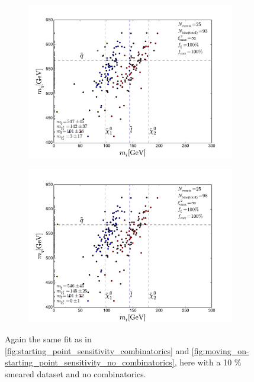 \documentclass[twoside,english]{uiofysmaster}
\begin{document}
\begin{figure}[hbt]
	\begin{subfigure}[b]{0.45\textwidth}
		\includegraphics[width=\textwidth]{figures/improving_combinatorics/herwigpp_10psmear_lowtol_nocomb_800-500-300-50.pdf} 
		\caption{ }
	\end{subfigure}
	\begin{subfigure}[b]{0.45\textwidth}
		\includegraphics[width=\textwidth]{figures/improving_combinatorics/herwigpp_10psmear_lowtol_nocomb_1000-100-80-30.pdf}
		\caption{ } 
	\end{subfigure}
	\caption{Again the same fit as in \ref{fig:starting_point_sensitivity_combinatorics} and \ref{fig:moving_on-starting_point_sensitivity_no_combinatorics}, here with a 10 \% smeared dataset and no combinatorics.}
	\label{fig:moving_on-starting_point_sensitivity_no_combinatorics_10pmomsmear}
\end{figure}
\end{document}
